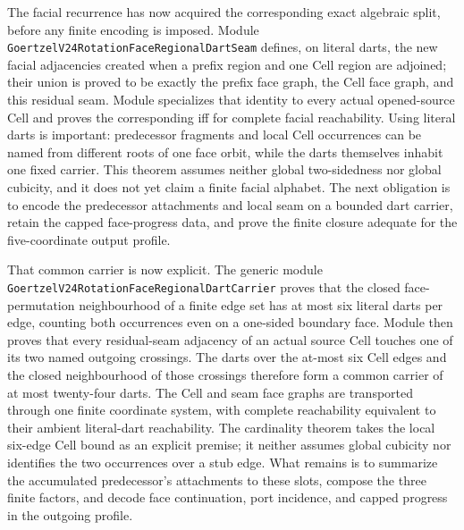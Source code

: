 \documentclass[11pt]{article}
\theoremstyle{definition}
\begin{document}
The facial recurrence has now acquired the corresponding exact algebraic
split, before any finite encoding is imposed.  Module
\texttt{GoertzelV24RotationFaceRegionalDartSeam} defines, on literal darts, the
new facial adjacencies created when a prefix region and one Cell region are
adjoined; their union is proved to be exactly the prefix face graph, the Cell
face graph, and this residual seam.  Module
specializes that identity to every actual opened-source Cell and proves the
corresponding iff for complete facial reachability.  Using literal darts is
important: predecessor fragments and local Cell occurrences can be named from
different roots of one face orbit, while the darts themselves inhabit one
fixed carrier.  This theorem assumes neither global two-sidedness nor global
cubicity, and it does not yet claim a finite facial alphabet.  The next
obligation is to encode the predecessor attachments and local seam on a
bounded dart carrier, retain the capped face-progress data, and prove the
finite closure adequate for the five-coordinate output profile.

That common carrier is now explicit.  The generic module
\texttt{GoertzelV24RotationFaceRegionalDartCarrier} proves that the closed
face-permutation neighbourhood of a finite edge set has at most six literal
darts per edge, counting both occurrences even on a one-sided boundary face.
Module
then proves that every residual-seam adjacency of an actual source Cell
touches one of its two named outgoing crossings.  The darts over the at-most
six Cell edges and the closed neighbourhood of those crossings therefore form
a common carrier of at most twenty-four darts.  The Cell and seam face graphs
are transported through one finite coordinate system, with complete
reachability equivalent to their ambient literal-dart reachability.  The
cardinality theorem takes the local six-edge Cell bound as an explicit
premise; it neither assumes global cubicity nor identifies the two occurrences
over a stub edge.  What remains is to summarize the accumulated predecessor's
attachments to these slots, compose the three finite factors, and decode face
continuation, port incidence, and capped progress in the outgoing profile.
\end{document}
